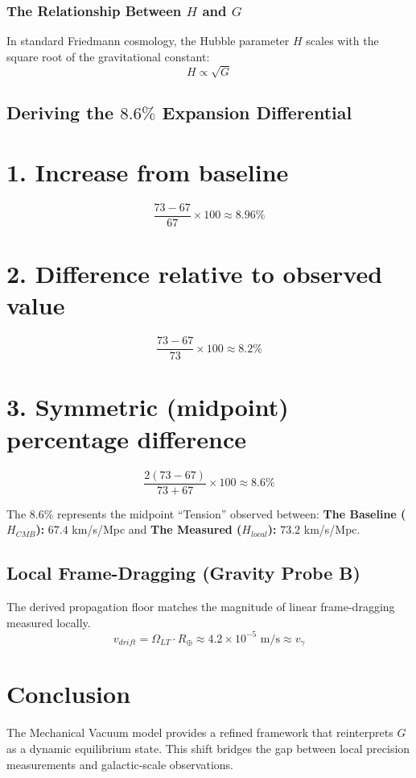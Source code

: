 \documentclass[12pt,a4paper]{article}
\begin{document}
\subsubsection*{The Relationship Between $H$ and $G$}
In standard Friedmann cosmology, the Hubble parameter $H$ scales with the square root of the gravitational constant:
\[ H \propto \sqrt{G} \]

\subsection{Deriving the $8.6\%$ Expansion Differential}

\section*{1. Increase from baseline}
\[ \frac{73 - 67}{67} \times 100 \approx \mathbf{8.96\%} \]

\section*{2. Difference relative to observed value}
\[ \frac{73 - 67}{73} \times 100 \approx \mathbf{8.2\%} \]

\section*{3. Symmetric (midpoint) percentage difference}
\[ \frac{2(73 - 67)}{73 + 67} \times 100 \approx \mathbf{8.6\%} \]

The $8.6\%$ represents the midpoint ``Tension'' observed between: 
\textbf{The Baseline ($H_{CMB}$):} $67.4$ km/s/Mpc and 
\textbf{The Measured ($H_{local}$):} $73.2$ km/s/Mpc.

\subsection{Local Frame-Dragging (Gravity Probe B)}
The derived propagation floor matches the magnitude of linear frame-dragging measured locally.
\begin{equation}
v_{drift} = \Omega_{LT} \cdot R_{\oplus} \approx 4.2 \times 10^{-5} \text{ m/s} \approx v_{\gamma}
\end{equation}

\section{Conclusion}
The Mechanical Vacuum model provides a refined framework that reinterprets $G$ as a dynamic equilibrium state. This shift bridges the gap between local precision measurements and galactic-scale observations.
\end{document}
